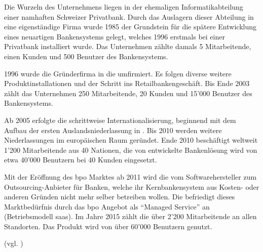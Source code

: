 \begin{sloppypar}
Die Wurzeln des Unternehmens {\companyshort} liegen in der ehemaligen Informatikabteilung einer namhaften Schweizer Privatbank. Durch das Auslagern dieser Abteilung in eine eigenständige Firma wurde 1985 der Grundstein für die spätere Entwicklung eines neuartigen Bankensystems gelegt, welches 1996 erstmals bei einer Privatbank installiert wurde. Das Unternehmen zählte damals 5 Mitarbeitende, einen Kunden und 500 Benutzer des Bankensystems.

1996 wurde die Gründerfirma in die {\companylong} umfirmiert. Es folgen diverse weitere Produktinstallationen und der Schritt ins Retailbankengeschäft. Bis Ende 2003 zählt das Unternehmen 250 Mitarbeitende, 20 Kunden und 15'000 Benutzer des Bankensystems.

Ab 2005 erfolgte die schrittweise Internationalisierung, beginnend mit dem Aufbau der ersten Auslandsniederlassung in \companyopscenterSEASIA. Bis 2010 werden weitere Niederlassungen im europäischen Raum geründet. Ende 2010 beschäftigt {\companyshort} weltweit 1'200 Mitarbeitende aus 40 Nationen, die von {\companyshort} entwickelte Bankenlösung wird von etwa 40'000 Benutzern bei 40 Kunden eingesetzt.

Mit der Eröffnung des \acrlong{bpo} Marktes ab 2011 wird die {\companylong} vom Softwarehersteller zum Outsourcing-Anbieter für Banken, welche ihr Kernbankensystem aus Kosten- oder anderen Gründen nicht mehr selber betreiben wollen. Die {\companyshort} befriedigt dieses Marktbedürfnis durch das \acrshort{bpo} Angebot als "`Managed Service"' an (Betriebsmodell \acrshort{saas}). Im Jahre 2015 zählt die \group über 2'200 Mitarbeitende an allen Standorten. Das Produkt \abs wird von über 60'000 Benutzern genutzt.

(vgl. \cite{avaloq_geschichte_????})
\end{sloppypar}
